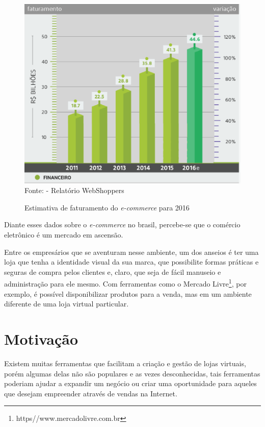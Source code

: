 \documentclass[a4paper,12pt]{monografia}
\begin{document}
\begin{figure}[H]
\centering
\caption{Estimativa de faturamento do \textit{e-commerce} para 2016}
\centering
\includegraphics[width=12cm]{img/webshoppers/estimativa-faturamento.eps}\\
\small{Fonte:  - Relatório WebShoppers}
\label{figura:estimativa:faturamento}
\end{figure}

Diante esses dados sobre o \textit{e-commerce} no brasil, percebe-se que o comércio eletrônico é um mercado em ascensão.

Entre os empresários que se aventuram nesse ambiente, um dos anseios é ter uma loja que tenha a identidade visual da sua marca, que possibilite formas práticas e seguras de compra pelos clientes e, claro, que seja de fácil manuseio e administração para ele mesmo. Com ferramentas como o Mercado Livre\footnote{https//www.mercadolivre.com.br}, por exemplo, é possível disponibilizar produtos para a venda, mas em um ambiente diferente de uma loja virtual particular.

\section{Motivação} %
\label{sec:motivacao}

Existem muitas ferramentas que facilitam a criação e gestão de lojas virtuais, porém algumas delas não são populares e as vezes desconhecidas, tais ferramentas poderiam ajudar a expandir um negócio ou criar uma oportunidade para aqueles que desejam empreender através de vendas na Internet. 
\end{document}
